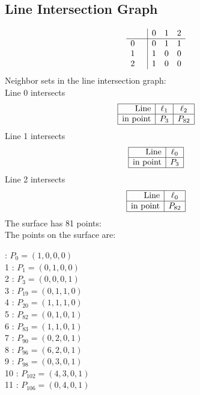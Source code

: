 \documentclass{article}
\begin{document}
{\subsection*{Line Intersection Graph}
{\arraycolsep=1pt
$$
\begin{array}{rr|*{3}r}
 &  & 0 & 1 & 2\\
\hline
0 &  & 0 & 1 & 1\\
1 &  & 1 & 0 & 0\\
2 &  & 1 & 0 & 0\\
\end{array}
$$
}%
Neighbor sets in the line intersection graph:\\
Line 0 intersects 
$$
\begin{array}{|r*{2}{|c}|}
\hline
\mbox{Line}  & \ell_{1} & \ell_{2}\\
\hline
\mbox{in point}  & P_{3} & P_{82}\\
\hline
\end{array}
$$
Line 1 intersects 
$$
\begin{array}{|r*{1}{|c}|}
\hline
\mbox{Line}  & \ell_{0}\\
\hline
\mbox{in point}  & P_{3}\\
\hline
\end{array}
$$
Line 2 intersects 
$$
\begin{array}{|r*{1}{|c}|}
\hline
\mbox{Line}  & \ell_{0}\\
\hline
\mbox{in point}  & P_{82}\\
\hline
\end{array}
$$
The surface has 81 points:\\
The points on the surface are:\\
\begin{multicols}{3}
 : $P_{0}=( 1, 0, 0, 0 )$\\
1 : $P_{1}=( 0, 1, 0, 0 )$\\
2 : $P_{3}=( 0, 0, 0, 1 )$\\
3 : $P_{19}=( 0, 1, 1, 0 )$\\
4 : $P_{20}=( 1, 1, 1, 0 )$\\
5 : $P_{82}=( 0, 1, 0, 1 )$\\
6 : $P_{83}=( 1, 1, 0, 1 )$\\
7 : $P_{90}=( 0, 2, 0, 1 )$\\
8 : $P_{96}=( 6, 2, 0, 1 )$\\
9 : $P_{98}=( 0, 3, 0, 1 )$\\
10 : $P_{102}=( 4, 3, 0, 1 )$\\
11 : $P_{106}=( 0, 4, 0, 1 )$\\

\end{multicols}}
\end{document}
